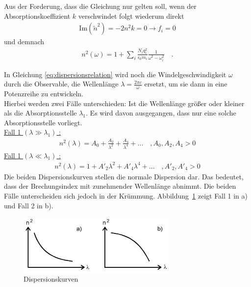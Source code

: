 Aus der Forderung, dass die Gleichung nur gelten soll, wenn der Absorptionskoeffizient $k$ verschwindet folgt wiederum direkt
\begin{align}
\text{Im}\left( \tilde{n}^2 \right) = -2 n^2 k = 0 \rightarrow f_i = 0
\end{align}
und demnach
\begin{align} \label{eq:dispersionsrelation}
n^2(\omega) = 1 + \sum_{i} \frac{N_i q_i^2}{\epsilon_0 m_i} \frac{1}{\omega^2 - \omega_i^2}  \quad.
\end{align}
\clearpage

In Gleichung \eqref{eq:dispersionsrelation} wird noch die Windelgeschwindigkeit $\omega$ durch die Observable, die Wellenlänge $\lambda  = \frac{2 \pi c}{\omega}$ ersetzt, um sie dann in eine Potenzreihe zu entwickeln. \\
Hierbei werden zwei Fälle unterschieden: Ist die Wellenlänge größer oder kleiner als die Absorptionsstelle $\lambda_1$. Es wird davon ausgegangen, dass nur eine solche Absorptionsstelle vorliegt. \\
\underline{Fall 1 $(\lambda \gg \lambda_1)$ :}  \\
\begin{align}
n^2(\lambda) = A_0 + \frac{A_2}{\lambda^2} + \frac{A_4}{\lambda^4} + ... \quad , A_0, A_2, A_4 > 0
\end{align}
\underline{Fall 1 $(\lambda \ll \lambda_1)$ :}  \\
\begin{align}
n^2(\lambda) = 1 + A'_2 \lambda^2 + A'_4 \lambda^4 + ... \quad , A'_2, A'_4 > 0
\end{align}
Die beiden Dispersionskurven stellen die normale Dispersion dar. Das bedeutet, dass der Brechungsindex mit zunehmender Wellenlänge abnimmt. Die beiden Fälle unterscheiden sich jedoch in der Krümmung. Abbildung~\ref{fig:dispersionskurven} zeigt Fall 1 in a) und Fall 2 in b).

\begin{figure}[h!]
	\centering
	\includegraphics[width=0.7\textwidth]{Theorie.png}
	\caption{Dispersionskurven}
	\label{fig:dispersionskurven}
\end{figure}